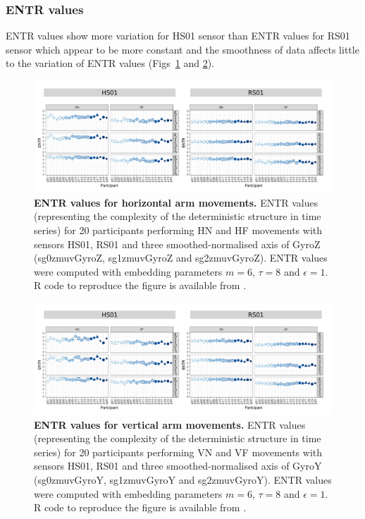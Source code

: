 

\subsubsection*{ENTR values}
ENTR values show more variation for HS01 sensor than ENTR values for RS01 sensor
which appear to be more constant and the smoothness of data affects little 
to the variation of ENTR values (Figs~\ref{fig:entr_aH} and \ref{fig:entr_aV}).
\begin{figure}[!h]
\centering
\includegraphics[width=1.0\textwidth]{entr_aH}
    \caption{
	{\bf ENTR values for horizontal arm movements.}
    	ENTR values (representing the complexity of the deterministic structure in time series) for 
	20 participants performing HN and HF movements
	with sensors HS01, RS01 and three smoothed-normalised axis 
	of GyroZ (sg0zmuvGyroZ, sg1zmuvGyroZ and sg2zmuvGyroZ).
	ENTR values were computed with 
	embedding parameters $m=6$, $\tau=8$ and $\epsilon=1$.
	R code to reproduce the figure is available from \cite{hwum2018}.
        }
    \label{fig:entr_aH}
\end{figure}
\begin{figure}[!h]
\centering
\includegraphics[width=1.0\textwidth]{entr_aV}
    \caption{
	{\bf ENTR values for vertical arm movements.}
    	ENTR values (representing the complexity of the deterministic structure in time series) for 
	20 participants performing VN and VF movements
	with sensors HS01, RS01 and three smoothed-normalised axis 
	of GyroY (sg0zmuvGyroY, sg1zmuvGyroY and sg2zmuvGyroY).
	ENTR values were computed with 
	embedding parameters $m=6$, $\tau=8$ and $\epsilon=1$.
	R code to reproduce the figure is available from \cite{hwum2018}.
        }
    \label{fig:entr_aV}
\end{figure}





